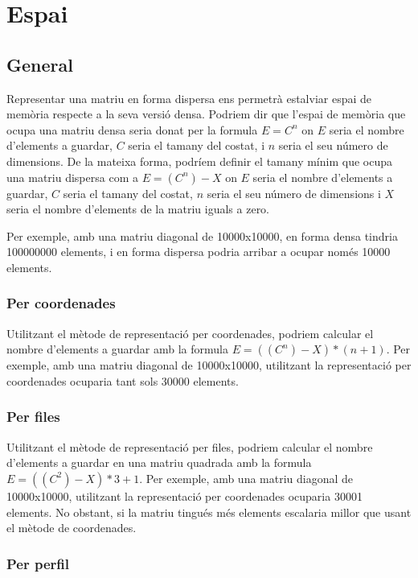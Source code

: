 \documentclass[11pt,a4paper,twoside]{report}
\begin{document}
\section{Espai}

\subsection{General}

Representar una matriu en forma dispersa ens permetrà estalviar espai de memòria respecte a la seva versió densa.
Podriem dir que l'espai de memòria que ocupa una matriu densa seria donat per la formula $E=C^n$ on $E$ seria el nombre d'elements a guardar, $C$ seria el tamany del costat, i $n$ seria el seu número de dimensions.
De la mateixa forma, podríem definir el tamany mínim que ocupa una matriu dispersa com a $E=(C^n)-X$ on $E$ seria el nombre d'elements a guardar, $C$ seria el tamany del costat, $n$ seria el seu número de dimensions i $X$ seria el nombre d'elements de la matriu iguals a zero.


Per exemple, amb una matriu diagonal de 10000x10000, en forma densa tindria 100000000 elements, i en forma dispersa podria arribar a ocupar només 10000 elements.
\subsubsection{Per coordenades}

Utilitzant el mètode de representació per coordenades, podriem calcular el nombre d'elements a guardar amb la formula $E=((C^n)-X)*(n+1)$.
Per exemple, amb una matriu diagonal de 10000x10000, utilitzant la representació per coordenades ocuparia tant sols 30000 elements.

\subsubsection{Per files}

Utilitzant el mètode de representació per files, podriem calcular el nombre d'elements a guardar en una matriu quadrada  amb la formula $E=((C^2)-X)*3+1$.
Per exemple, amb una matriu diagonal de 10000x10000, utilitzant la representació per coordenades ocuparia 30001 elements. No obstant, si la matriu tingués més elements
escalaria millor que usant el mètode de coordenades.

\subsubsection{Per perfil}
\end{document}
